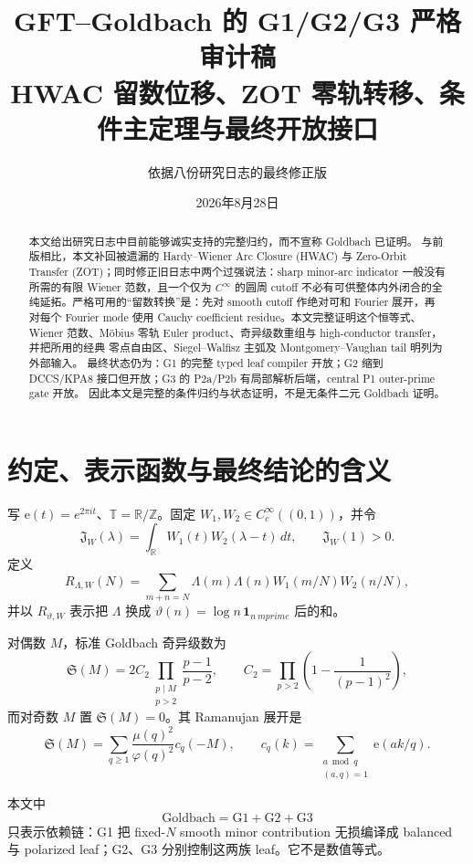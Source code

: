 \documentclass[11pt,a4paper]{ctexart}
\title{GFT--Goldbach 的 G1/G2/G3 严格审计稿\\
\large HWAC 留数位移、ZOT 零轨转移、条件主定理与最终开放接口}
\author{依据八份研究日志的最终修正版}
\date{2026年8月28日}
\theoremstyle{definition}
\newcommand{\T}{\mathbb T}
\newcommand{\e}{\mathrm e}
\newcommand{\1}{\mathbf 1}
\begin{document}
\maketitle

\begin{abstract}
\sloppy
本文给出研究日志中目前能够诚实支持的完整归约，而不宣称 Goldbach 已证明。
与前版相比，本文补回被遗漏的 Hardy--Wiener Arc Closure (HWAC) 与
Zero-Orbit Transfer (ZOT)；同时修正旧日志中两个过强说法：sharp minor-arc
indicator 一般没有所需的有限 Wiener 范数，且一个仅为 $C^\infty$ 的圆周
cutoff 不必有可供整体内外闭合的全纯延拓。严格可用的“留数转换”是：先对
smooth cutoff 作绝对可和 Fourier 展开，再对每个 Fourier mode 使用 Cauchy
coefficient residue。本文完整证明这个恒等式、Wiener 范数、Möbius 零轨
Euler product、奇异级数重组与 high-conductor transfer，并把所用的经典
零点自由区、Siegel--Walfisz 主弧及 Montgomery--Vaughan tail 明列为外部输入。
最终状态仍为：G1 的完整 typed leaf compiler 开放；G2 缩到 DCCS/KPA8
接口但开放；G3 的 P2a/P2b 有局部解析后端，central P1 outer-prime gate 开放。
因此本文是完整的条件归约与状态证明，不是无条件二元 Goldbach 证明。
\end{abstract}

\section{约定、表示函数与最终结论的含义}

写 $\e(t)=e^{2\pi i t}$、$\T=\mathbb R/\mathbb Z$。固定
$W_1,W_2\in C_c^\infty((0,1))$，并令
\[
\mathfrak J_W(\lambda)=\int_{\mathbb R}W_1(t)W_2(\lambda-t)\,dt,
\qquad \mathfrak J_W(1)>0.
\tag{1.1}
\]
定义
\[
R_{\Lambda,W}(N)=\sum_{m+n=N}\Lambda(m)\Lambda(n)
 W_1(m/N)W_2(n/N),                                      \tag{1.2}
\]
并以 $R_{\vartheta,W}$ 表示把 $\Lambda$ 换成
$\vartheta(n)=\log n\,\1_{n\ {
m prime}}$ 后的和。

对偶数 $M$，标准 Goldbach 奇异级数为
\[
\mathfrak S(M)=2C_2\prod_{\substack{p\mid M\\p>2}}\frac{p-1}{p-2},
\qquad
C_2=\prod_{p>2}\left(1-\frac1{(p-1)^2}\right),          \tag{1.3}
\]
而对奇数 $M$ 置 $\mathfrak S(M)=0$。其 Ramanujan 展开是
\[
\mathfrak S(M)=\sum_{q\ge1}\frac{\mu(q)^2}{\varphi(q)^2}c_q(-M),
\qquad
c_q(k)=\sum_{\substack{a\bmod q\\(a,q)=1}}\e(ak/q).   \tag{1.4}
\]

本文中
\[
\boxed{\text{Goldbach}=\mathrm{G1}+\mathrm{G2}+\mathrm{G3}}
\]
只表示依赖链：G1 把 fixed-$N$ smooth minor contribution 无损编译成
balanced 与 polarized leaf；G2、G3 分别控制这两族 leaf。它不是数值等式。
\end{document}
